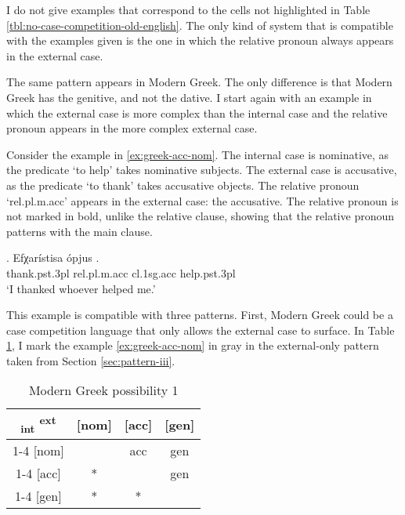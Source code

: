 I do not give examples that correspond to the cells not highlighted in Table \ref{tbl:no-case-competition-old-english}. The only kind of system that is compatible with the examples given is the one in which the relative pronoun always appears in the external case.

The same pattern appears in Modern Greek. The only difference is that Modern Greek has the genitive, and not the dative. I start again with an example in which the external case is more complex than the internal case and the relative pronoun appears in the more complex external case.

Consider the example in \ref{ex:greek-acc-nom}.
The internal case is nominative, as the predicate  `to help' takes nominative subjects.
The external case is accusative, as the predicate  `to thank' takes accusative objects.
The relative pronoun  `\ac{rel}.\ac{pl}.\ac{m}.\ac{acc}' appears in the external case: the accusative. The relative pronoun is not marked in bold, unlike the relative clause, showing that the relative pronoun patterns with the main clause.

\exg. Efχarístisa ópjus  .\\
thank.\ac{pst}.3\ac{pl}\scsub{[acc]} \ac{rel}.\ac{pl}.\ac{m}.\ac{acc} \ac{cl}.1\ac{sg}.\ac{acc} help.\ac{pst}.3\ac{pl}\scsub{[nom]}\\
`I thanked whoever helped me.' \label{ex:greek-acc-nom}

This example is compatible with three patterns. First, Modern Greek could be a case competition language that only allows the external case to surface. In Table \ref{tbl:greek-poss1}, I mark the example \ref{ex:greek-acc-nom} in gray in the external-only pattern taken from Section \ref{sec:pattern-iii}.

 \begin{table}[H]
   \center
   \caption{Modern Greek possibility 1}
   \begin{tabular}{c|c|c|c}
     \toprule
     \textsubscript{\ac{int}} \textsuperscript{\ac{ext}}
            & [\ac{nom}]
            & [\ac{acc}]
            & [\ac{gen}]
            \\ \cmidrule{1-4}
        [\ac{nom}]
            & \xcancel{\phantom{xx}}
            & \cellcolor{LG}\ac{acc}
            & \ac{gen}
            \\ \cmidrule{1-4}
        [\ac{acc}]
            & *
            & \xcancel{\phantom{xx}}
            & \ac{gen}
            \\ \cmidrule{1-4}
        [\ac{gen}]
            & *
            & *
            & \xcancel{\phantom{xx}}
            \\
      \bottomrule
   \end{tabular}
     \label{tbl:greek-poss1}
 \end{table}

